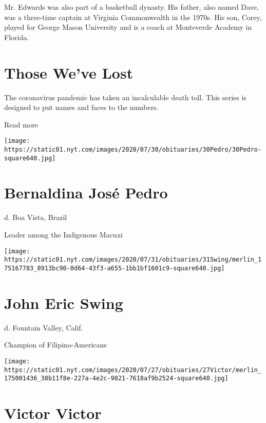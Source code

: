 Mr. Edwards was also part of a basketball dynasty. His father, also
named Dave, was a three-time captain at Virginia Commonwealth in the
1970s. His son, Corey, played for George Mason University and is a coach
at Monteverde Academy in Florida.

\href{https://www.nytimes.com/interactive/2020/obituaries/people-died-coronavirus-obituaries.html?action=click\&pgtype=Article\&state=default\&region=BELOW_MAIN_CONTENT\&context=covid_obits_promo}{}

\hypertarget{those-weve-lost}{%
\section{Those We've Lost}\label{those-weve-lost}}

The coronavirus pandemic has taken an incalculable death toll. This
series is designed to put names and faces to the numbers.

Read more

\texttt{[image: https://static01.nyt.com/images/2020/07/30/obituaries/30Pedro/30Pedro-square640.jpg]}

\hypertarget{bernaldina-josuxe9-pedro}{%
\section{Bernaldina José Pedro}\label{bernaldina-josuxe9-pedro}}

d. Boa Vista, Brazil

Leader among the Indigenous Macuxi

\texttt{[image: https://static01.nyt.com/images/2020/07/31/obituaries/31Swing/merlin\_175167783\_8913bc90-0d64-43f3-a655-1bb1bf1601c9-square640.jpg]}

\hypertarget{john-eric-swing}{%
\section{John Eric Swing}\label{john-eric-swing}}

d. Fountain Valley, Calif.

Champion of Filipino-Americans

\texttt{[image: https://static01.nyt.com/images/2020/07/27/obituaries/27Victor/merlin\_175001436\_38b11f8e-227a-4e2c-9821-7618af9b2524-square640.jpg]}

\hypertarget{victor-victor}{%
\section{Victor Victor}\label{victor-victor}}

